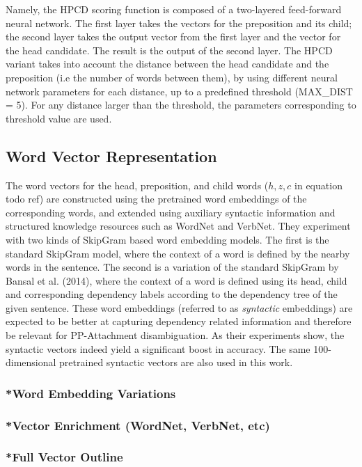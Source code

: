 Namely, the HPCD scoring function is composed of a two-layered feed-forward neural network. The first layer takes the vectors for the preposition and its child; the second layer takes the output vector from the first layer and the vector for the head candidate. The result is the output of the second layer. The HPCD variant takes into account the distance between the head candidate and the preposition (i.e the number of words between them), by using different neural network parameters for each distance, up to a predefined threshold (MAX\_DIST = 5). For any distance larger than the threshold, the parameters corresponding to threshold value are used.

\subsection{Word Vector Representation}

The word vectors for the head, preposition, and child words ($h, z, c$ in equation todo ref) are constructed using the pretrained word embeddings of the corresponding words, and extended using auxiliary syntactic information and structured knowledge resources such as WordNet and VerbNet. They experiment with two kinds of SkipGram based word embedding models. The first is the standard SkipGram model, where the context of a word is defined by the nearby words in the sentence. The second is a variation of the standard SkipGram by Bansal et al. (2014), where the context of a word is defined using its head, child and corresponding dependency labels according to the dependency tree of the given sentence. These word embeddings (referred to as \textit{syntactic} embeddings) are expected to be better at capturing dependency related information and therefore be relevant for PP-Attachment disambiguation. As their experiments show, the syntactic vectors indeed yield a significant boost in accuracy. The same 100-dimensional pretrained syntactic vectors are also used in this work. 





\subsubsection{*Word Embedding Variations}
\subsubsection{*Vector Enrichment (WordNet, VerbNet, etc)}
\subsubsection{*Full Vector Outline}
